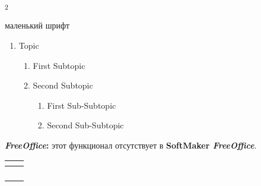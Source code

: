 \textsubscript{2}


{\footnotesize маленький шрифт}

\begin{enumerate}
  \item Topic
  \begin{enumerate}[label*=\arabic*.]
    \item First Subtopic
    \item Second Subtopic
    \begin{enumerate}[label*=\arabic*.]
      \item First Sub-Subtopic
      \item Second Sub-Subtopic
    \end{enumerate}
  \end{enumerate}
\end{enumerate}


\begin{mdframed}[backgroundcolor=pink!50]
\textbf{\textit{FreeOffice}:} этот функционал отсутствует в \textbf{SoftMaker \textit{FreeOffice}}.
\end{mdframed}


\begin{center}
\begin{tabular}{  m{4cm}  m{12cm}  }
 \textbf{} & \textbf{}\\ 
 \hline
  \textbf{} & \\
  \textbf{} & \\ 
\textbf{} & \\
\textbf{} & \\
\end{tabular}
\end{center}
